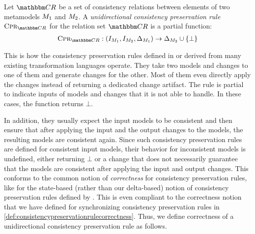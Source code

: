 \begin{definition}
    \label{def:unidirectionalconsistencypreservationrule}
    Let $\consistencyrelationset{CR}$ be a set of consistency relations between elements of two metamodels $\metamodel{M}{1}$ and $\metamodel{M}{2}$.
    A \emph{unidirectional consistency preservation rule} $\consistencypreservationrule{\consistencyrelationset{CR}}$ for the relation set $\consistencyrelationset{CR}$ is a partial function:
    \begin{align*}
        \consistencypreservationrule{\consistencyrelationset{CR}} : (\metamodelinstanceset{M}{1}, \metamodelinstanceset{M}{2}, \changeuniverse{\metamodel{M}{1}}) \rightarrow \changeuniverse{\metamodel{M}{2}} \cup \setted{\bot}
    \end{align*}
\end{definition}

This is how the consistency preservation rules defined in or derived from many existing transformation languages operate.
They take two models and changes to one of them and generate changes for the other.
Most of them even directly apply the changes instead of returning a dedicated change artifact.
The rule is partial to indicate inputs of models and changes that it is not able to handle. In these cases, the function returns $\bot$.

In addition, they usually expect the input models to be consistent and then ensure that after applying the input and the output changes to the models, the resulting models are consistent again.
Since such consistency preservation rules are defined for consistent input models, their behavior for inconsistent models is undefined, either returning $\bot$ or a change that does not necessarily guarantee that the models are consistent after applying the input and output changes.
This conforms to the common notion of \emph{correctness} for consistency preservation rules, like for the state-based (rather than our delta-based) notion of consistency preservation rules defined by \textcite{stevens2010sosym}.
This is even compliant to the correctness notion that we have defined for synchronizing consistency preservation rules in \autoref{def:consistencypreservationrulecorrectness}.
Thus, we define correctness of a unidirectional consistency preservation rule as follows.

